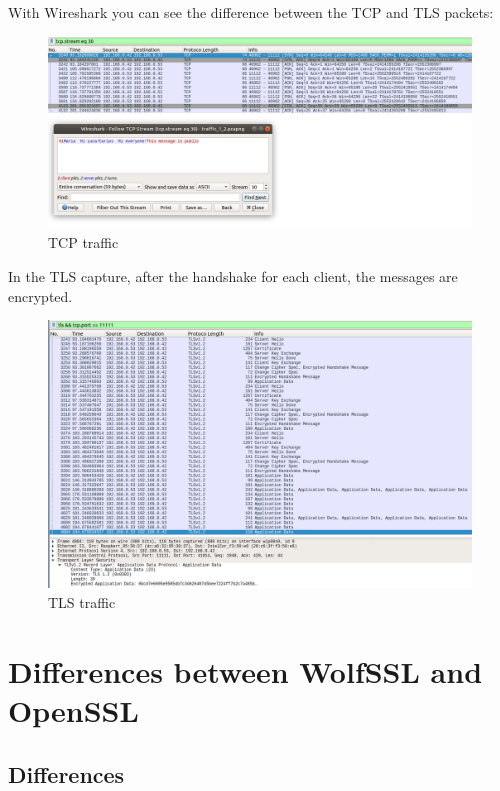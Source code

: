 \documentclass[a4paper,12pt]{article}
\begin{document}
With Wireshark you can see the difference between the TCP and TLS packets:
\begin{figure}[H]
    \centering
    \includegraphics[scale=0.3]{./code/img/tcp-traffic.png}
    \caption{TCP traffic}
\end{figure}
In the TLS capture, after the handshake for each client, the messages are encrypted.
\begin{figure}[H]
    \centering
    \includegraphics[scale=0.3]{./code/img/tls-traffic.png}
    \caption{TLS traffic}
\end{figure}


\section{Differences between WolfSSL and OpenSSL}
\subsection{Differences}
\end{document}
